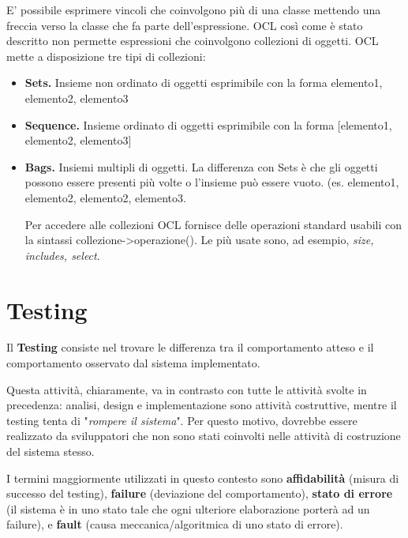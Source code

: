 \documentclass{article}
\begin{document}
        E’ possibile esprimere vincoli che coinvolgono più di una classe mettendo una freccia verso la classe che fa parte dell’espressione. OCL così come è stato descritto non permette espressioni che coinvolgono collezioni di oggetti. OCL mette a disposizione tre tipi di collezioni: 
        
        \begin{itemize}
            \item \textbf{Sets.} Insieme non ordinato di oggetti esprimibile con la forma {elemento1, elemento2, elemento3}
            
            \item \textbf{Sequence.} Insieme ordinato di oggetti esprimibile con la forma [elemento1, elemento2, elemento3]
            
            \item \textbf{Bags.} Insiemi multipli di oggetti. La differenza con Sets è che gli oggetti possono essere presenti più volte o l’insieme può essere vuoto. (es. {elemento1, elemento2, elemento2, elemento3}. 
            
            Per accedere alle collezioni OCL fornisce delle operazioni standard usabili con la sintassi collezione->operazione(). Le più usate sono, ad esempio, \textit{size, includes, select}.
        \end{itemize}
        
\section{Testing}
    
    Il \textbf{Testing} consiste nel trovare le differenza tra il comportamento atteso e il comportamento osservato dal sistema implementato.
    
    \vspace{3mm}
    
    Questa attività, chiaramente, va in contrasto con tutte le attività svolte in precedenza: analisi, design e implementazione sono attività costruttive, mentre il testing tenta di "\textit{rompere il sistema}". Per questo motivo, dovrebbe essere realizzato da sviluppatori che non sono stati coinvolti nelle attività di costruzione del sistema stesso.
    
    \vspace{3mm}
    
    I termini maggiormente utilizzati in questo contesto sono \textbf{affidabilità} (misura di successo del testing), \textbf{failure} (deviazione del comportamento), \textbf{stato di errore} (il sistema è in uno stato tale che ogni ulteriore elaborazione porterà ad un failure), e \textbf{fault} (causa meccanica/algoritmica di uno stato di errore).
\end{document}
